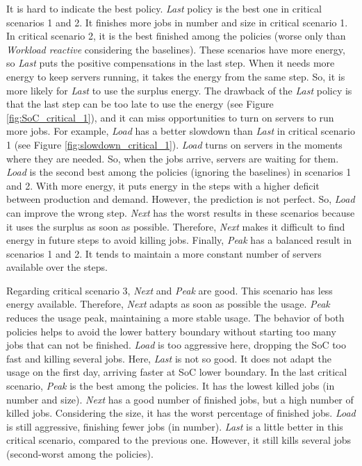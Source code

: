 It is hard to indicate the best policy. \emph{Last} policy is the best one in critical scenarios 1 and 2. It finishes more jobs in number and size in critical scenario 1. In critical scenario 2, it is the best finished among the policies (worse only than \emph{Workload reactive} considering the baselines). These scenarios have more energy, so \emph{Last} puts the positive compensations in the last step. When it needs more energy to keep servers running, it takes the energy from the same step. So, it is more likely for \emph{Last} to use the surplus energy. The drawback of the \emph{Last} policy is that the last step can be too late to use the energy (see Figure \ref{fig:SoC_critical_1}), and it can miss opportunities to turn on servers to run more jobs. For example, \emph{Load} has a better slowdown than \emph{Last} in critical scenario 1 (see Figure \ref{fig:slowdown_critical_1}). \emph{Load} turns on servers in the moments where they are needed. So, when the jobs arrive, servers are waiting for them. \emph{Load} is the second best among the policies (ignoring the baselines) in scenarios 1 and 2. With more energy, it puts energy in the steps with a higher deficit between production and demand. However, the prediction is not perfect. So, \emph{Load} can improve the wrong step. \emph{Next} has the worst results in these scenarios because it uses the surplus as soon as possible. Therefore, \emph{Next} makes it difficult to find energy in future steps to avoid killing jobs. Finally, \emph{Peak} has a balanced result in scenarios 1 and 2. It tends to maintain a more constant number of servers available over the steps. 

Regarding critical scenario 3, \emph{Next} and \emph{Peak} are good. This scenario has less energy available. Therefore, \emph{Next} adapts as soon as possible the usage. \emph{Peak} reduces the usage peak, maintaining a more stable usage. The behavior of both policies helps to avoid the lower battery boundary without starting too many jobs that can not be finished. \emph{Load} is too aggressive here, dropping the SoC too fast and killing several jobs. Here, \emph{Last} is not so good. It does not adapt the usage on the first day, arriving faster at SoC lower boundary. In the last critical scenario, \emph{Peak} is the best among the policies. It has the lowest killed jobs (in number and size). \emph{Next} has a good number of finished jobs, but a high number of killed jobs. Considering the size, it has the worst percentage of finished jobs. \emph{Load} is still aggressive, finishing fewer jobs (in number). \emph{Last} is a little better in this critical scenario, compared to the previous one. However, it still kills several jobs (second-worst among the policies). 


